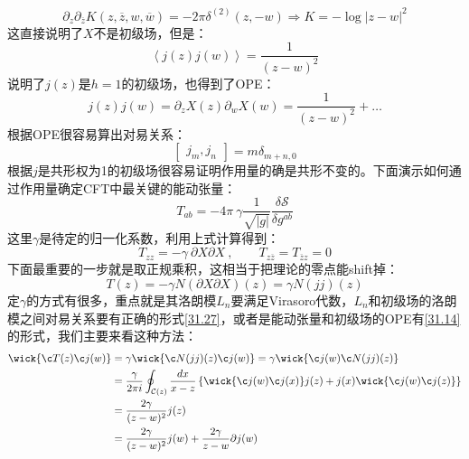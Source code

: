 \begin{equation}
	\partial_z\partial_{\overline{z}}K(z,\overline{z},w,\overline{w})=-2\pi\delta^{(2)}(z,-w)\Rightarrow K=-\log\left|z-w\right|^2
\end{equation}
这直接说明了$X$不是初级场，但是：
\begin{equation}
	\left\langle j(z)j(w)\right\rangle=\frac{1}{(z-w)^2}
\end{equation}
说明了$j(z)$是$h=1$的初级场，也得到了OPE：
\begin{equation}\label{35.7}
	\boxed{
		j(z)j(w)=\partial_z X(z)\partial_w X(w)=\frac{1}{(z-w)^2}+\ldots
	}
\end{equation}
根据OPE很容易算出对易关系：
\begin{equation}
	\boxed{
		\begin{bmatrix}j_m,j_n\end{bmatrix}= m\delta_{m+n,0}
	}
\end{equation}
根据$j$是共形权为1的初级场很容易证明作用量的确是共形不变的。下面演示如何通过作用量确定CFT中最关键的能动张量：
\begin{equation}
	T_{ab}=-4\pi~\gamma\frac1{\sqrt{|g|}}\frac{\delta\mathcal{S}}{\delta g^{ab}}
\end{equation}
这里$\gamma$是待定的归一化系数，利用上式计算得到：
\begin{equation}
	T_{zz}=-\gamma\mathrm{~}\partial X\partial X\mathrm{~},\quad\quad T_{z\overline{z}}=T_{\overline{z}z}=0
\end{equation}
下面最重要的一步就是取正规乘积，这相当于把理论的零点能shift掉：
\begin{equation}
	T(z)=-\gamma N(\partial X\partial X)(z)=\gamma N(jj)(z)
\end{equation}
定$\gamma$的方式有很多，重点就是其洛朗模$L_n$要满足Virasoro代数，$L_n$和初级场的洛朗模之间对易关系要有正确的形式\ref{31.27}，或者是能动张量和初级场的OPE有\ref{31.14}的形式，我们主要来看这种方法：
\begin{equation}
	\begin{aligned}
		\wick{\c T(z)\c j(w)}&=\gamma \wick{\c N(jj)(z)\c j(w)}=\gamma \wick{\c j(w)\c N(jj)(z)}\\
		&=\frac{\gamma}{2\pi i}\oint_{\mathcal{C}(z)}\frac{dx}{x-z}\left\{\wick{\c j(w)\c j(x)}j(z)+j(x)\wick{\c j(w)\c j(z)}\right\}\\
		&=\frac{2\gamma}{(z-w)^2}j(z)\\
		&=\frac{2\gamma}{(z-w)^2}j(w)+\frac{2\gamma}{z-w}\partial j(w)
	\end{aligned}
\end{equation}

